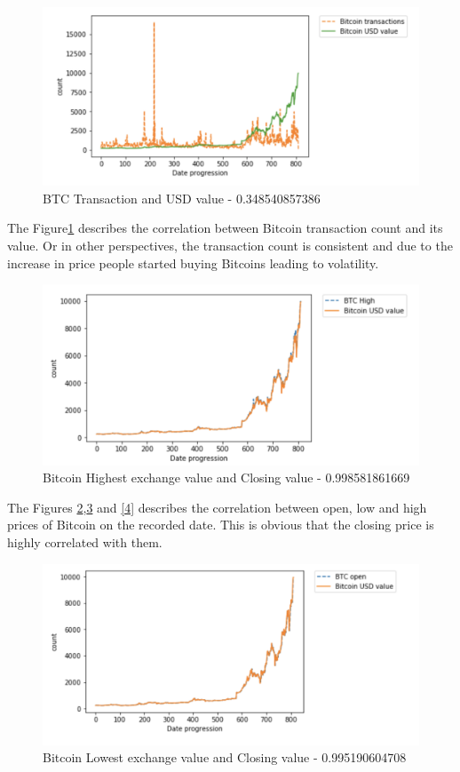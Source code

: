 \documentclass[sigconf]{acmart}
\begin{document}
\begin{figure}[!ht]
  \centering\includegraphics[width=\columnwidth]{images/BTC-prcvsBTC-trans.png}
  \caption{BTC Transaction and USD value - 0.348540857386 }
  \label{1}
\end{figure}

The Figure\ref{1} describes the correlation between Bitcoin transaction count and its value. Or in other perspectives, the transaction count is consistent and due to the increase in price people started buying Bitcoins leading to volatility.

\begin{figure}[!ht]
  \centering\includegraphics[width=\columnwidth]{images/High.png}
  \caption{Bitcoin Highest exchange value and Closing value - 0.998581861669  }
  \label{2}
\end{figure}

The Figures \ref{2},\ref{3} and \ref{4} describes the correlation between open, low and high prices of Bitcoin on the recorded date. This is obvious that the closing price is highly correlated with them.

\begin{figure}[!ht]
  \centering\includegraphics[width=\columnwidth]{images/Open.png}
  \caption{Bitcoin Lowest exchange value and Closing value - 0.995190604708  }
  \label{3}
\end{figure}
\end{document}
